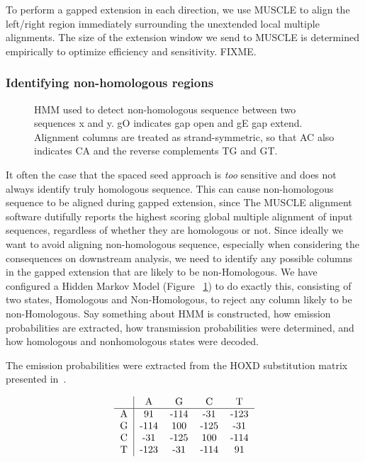 \documentclass{ws-procs9x6}
\begin{document}
To perform a gapped extension in each direction, we use MUSCLE to align the left/right region immediately surrounding the unextended local multiple alignments. The size of the extension window we send to MUSCLE is determined empirically to optimize efficiency and sensitivity. FIXME.
\subsubsection{Identifying non-homologous regions}
\begin{figure}[t]
\centering {}
\caption{HMM used to detect non-homologous sequence between two sequences x and y. gO indicates gap open and gE gap extend. Alignment columns are treated as strand-symmetric, so that AC also indicates CA and the reverse complements TG and GT.}

\label{fig-hmm}\vspace{-0.2cm}
\end{figure}

It often the case that the spaced seed approach is \emph{too} sensitive and does not always identify truly homologous sequence. This can cause non-homologous sequence to be aligned during gapped extension, since The MUSCLE alignment software dutifully reports the highest scoring global multiple alignment of input sequences, regardless of whether they are homologous or not. Since ideally we want to avoid aligning non-homologous sequence, especially when considering the consequences on downstream analysis, we need to identify any possible columns in the gapped extension that are likely to be non-Homologous. We have configured a Hidden Markov Model (Figure ~\ref{fig-hmm}) to do exactly this, consisting of two states, Homologous and Non-Homologous, to reject any column likely to be non-Homologous. Say something about HMM is constructed, how emission probabilities are extracted, how transmission probabilities were determined, and how homologous and nonhomologous states were decoded.

The emission probabilities were extracted from the HOXD substitution matrix presented in~\cite{hoxd}.

\begin{equation}
\begin{tabular}
{c|cccc}
& A & G & C & T \\
\hline
 A   & 91 & -114 &-31 & -123 \\
 G   & -114 & 100 &-125 & -31 \\
 C   & -31 & -125 &100 & -114\\
 T   & -123 & -31 &-114 & 91 \\
\end{tabular}
\end{equation}
\end{document}
